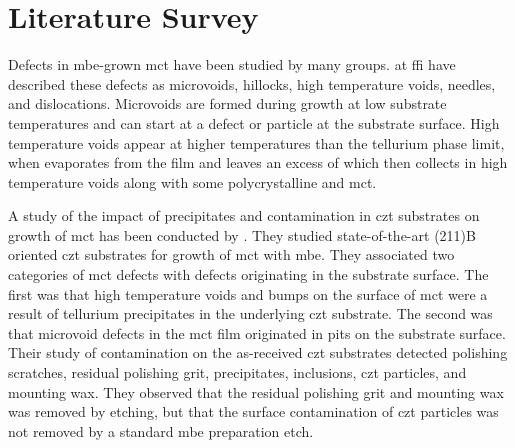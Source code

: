 \section{Literature Survey}%
%
%
%
%
%
Defects in \ac{mbe}-grown \ac{mct} have been studied by many groups. \citet{selvig2007defects, selvig2008defects-a, selvig2008defects-b} at \ac{ffi} have described these defects as microvoids, hillocks, high temperature voids, needles, and dislocations. Microvoids are formed during growth at low substrate temperatures and can start at a defect or particle at the substrate surface. High temperature voids appear at higher temperatures than the tellurium phase limit, when  evaporates from the film and leaves an excess of  which then collects in high temperature voids along with some polycrystalline  and \ac{mct}.

A study of the impact of precipitates and contamination in \ac{czt} substrates on growth of \ac{mct} has been conducted by \citet{benson2014impact, benson2015as-received, benson2016analysis}. They studied state-of-the-art (211)B oriented \ac{czt} substrates for growth of \ac{mct} with \ac{mbe}. They associated two categories of \ac{mct} defects with defects originating in the substrate surface. The first was that high temperature voids and bumps on the surface of \ac{mct} were a result of tellurium precipitates in the underlying \ac{czt} substrate. The second was that microvoid defects in the \ac{mct} film originated in pits on the substrate surface. Their study of contamination on the as-received \ac{czt} substrates  detected polishing scratches,  residual polishing grit,  precipitates,  inclusions, \ac{czt} particles, and mounting wax. They observed that the residual polishing grit and mounting wax was removed by etching, but that the surface contamination of \ac{czt} particles was not removed by a standard \ac{mbe} preparation etch. %

